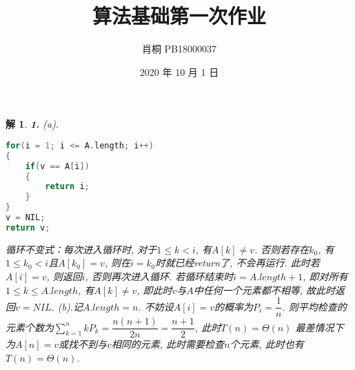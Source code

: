 \documentclass[UTF8]{ctexart}
\begin{document}
	\title{算法基础第一次作业}
	\author{肖桐 PB18000037}
	\date{2020 年 10 月 1 日}
	\maketitle
	
	\newtheorem*{solution}{解}
	
	\begin{solution}\textnormal{\textbf{1.}}
		(a).
		{\rm	%
		\begin{lstlisting}[language=C]
for(i = 1; i <= A.length; i++)
{
	if(v == A[i])
	{
		return i;
	}
}
v = NIL;
return v;
		\end{lstlisting}}
		\noindent
		循环不变式：每次进入循环时, 对于$1 \leq k < i$, 有$A[k] \neq v$.\newline
		否则若存在$k_0$, 有$1 \leq k_0 < i$且$A[k_0] = v$, 则在$i = k_0$时就已经return了, 不会再运行.\newline
		此时若$A[i] = v$, 则返回$i$, 否则再次进入循环.\newline
		若循环结束时$i = A.length + 1$, 即对所有$1 \leq k \leq A.length$, 有$A[k] \neq v$, 即此时$v$与$A$中任何一个元素都不相等, 故此时返回$v = NIL$.\newline
		(b).记$A.length = n$. 不妨设$A[i] = v$的概率为$P_i = \dfrac{1}{n}$.\newline
		则平均检查的元素个数为$\sum\limits_{k = 1}^{n}kP_k = \dfrac{n(n + 1)}{2n} = \dfrac{n + 1}{2}$, 此时$T(n) = \Theta(n)$\newline
		最差情况下为$A[n] = v$或找不到与$v$相同的元素, 此时需要检查$n$个元素, 此时也有$T(n) = \Theta(n)$.
	\end{solution}
\end{document}
